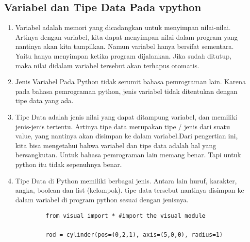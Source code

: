 \subsection{Variabel dan Tipe Data Pada vpython}	
		\begin{enumerate}
			\item Variabel adalah memori yang dicadangkan untuk menyimpan nilai-nilai. Artinya dengan variabel, kita dapat menyimpan nilai dalam program yang nantinya akan kita tampilkan. Namun variabel hanya bersifat sementara. Yaitu hanya menyimpan ketika program dijalankan. Jika sudah ditutup, maka nilai didalam variabel tersebut akan terhapus otomatis.
			\item Jenis Variabel Pada Python tidak serumit bahasa pemrograman lain. Karena pada bahasa pemrograman python, jenis variabel tidak ditentukan dengan tipe data yang ada. 
			\item Tipe Data adalah jenis nilai yang dapat ditampung variabel, dan memiliki jenis-jenis tertentu. Artinya tipe data merupakan tipe / jenis dari suatu value, yang nantinya akan disimpan ke dalam variabel.Dari pengertian ini, kita bisa mengetahui bahwa variabel dan tipe data adalah hal yang bersangkutan. Untuk bahasa pemrograman lain memang benar. Tapi untuk python itu tidak sepenuhnya benar.  
			\item Tipe Data di Python memiliki berbagai jenis. Antara lain huruf, karakter, angka, boolean dan list (kelompok). tipe data tersebut nantinya disimpan ke dalam variabel di program python sesuai dengan jenisnya. 
		\end{enumerate}
		\begin{verbatim}
			from visual import * #import the visual module

			rod = cylinder(pos=(0,2,1), axis=(5,0,0), radius=1)
		\end{verbatim}
